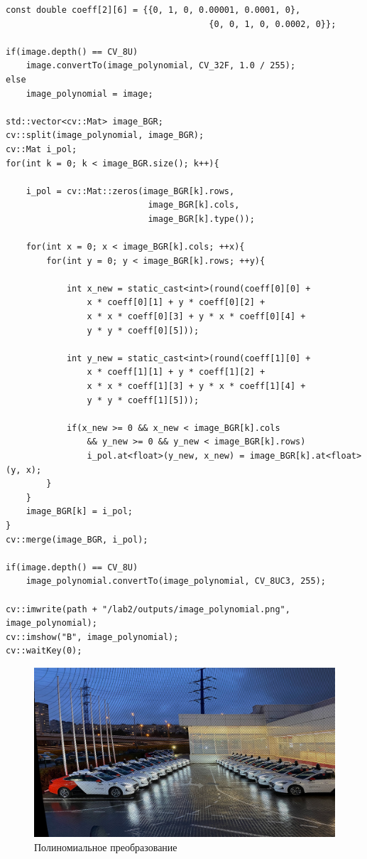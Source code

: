 \begin{lstlisting}[style=cpp_white, caption={Исходный код для полиномиального преобразования}]
const double coeff[2][6] = {{0, 1, 0, 0.00001, 0.0001, 0},
                                        {0, 0, 1, 0, 0.0002, 0}};

if(image.depth() == CV_8U)
    image.convertTo(image_polynomial, CV_32F, 1.0 / 255);
else
    image_polynomial = image;

std::vector<cv::Mat> image_BGR;
cv::split(image_polynomial, image_BGR);
cv::Mat i_pol;
for(int k = 0; k < image_BGR.size(); k++){

    i_pol = cv::Mat::zeros(image_BGR[k].rows, 
                            image_BGR[k].cols, 
                            image_BGR[k].type());

    for(int x = 0; x < image_BGR[k].cols; ++x){
        for(int y = 0; y < image_BGR[k].rows; ++y){

            int x_new = static_cast<int>(round(coeff[0][0] + 
                x * coeff[0][1] + y * coeff[0][2] + 
                x * x * coeff[0][3] + y * x * coeff[0][4] + 
                y * y * coeff[0][5]));

            int y_new = static_cast<int>(round(coeff[1][0] + 
                x * coeff[1][1] + y * coeff[1][2] + 
                x * x * coeff[1][3] + y * x * coeff[1][4] + 
                y * y * coeff[1][5]));

            if(x_new >= 0 && x_new < image_BGR[k].cols
                && y_new >= 0 && y_new < image_BGR[k].rows)
                i_pol.at<float>(y_new, x_new) = image_BGR[k].at<float>(y, x);
        }
    }
    image_BGR[k] = i_pol;
}
cv::merge(image_BGR, i_pol);

if(image.depth() == CV_8U)
    image_polynomial.convertTo(image_polynomial, CV_8UC3, 255);

cv::imwrite(path + "/lab2/outputs/image_polynomial.png", image_polynomial);
cv::imshow("B", image_polynomial);
cv::waitKey(0); 
\end{lstlisting}

\begin{figure}[ht]
    \includegraphics[width=\textwidth]{../outputs/image_polynomial.png}
    \caption{Полиномиальное преобразование}
    \label{fig:polynomial_image}
\end{figure}


